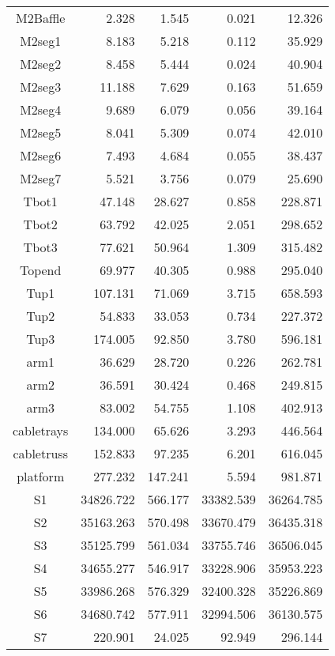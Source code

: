 \begin{longtable}{crrrr}
 M2Baffle & 2.328 & 1.545 & 0.021 & 12.326 \\
 M2seg1 & 8.183 & 5.218 & 0.112 & 35.929 \\
 M2seg2 & 8.458 & 5.444 & 0.024 & 40.904 \\
 M2seg3 & 11.188 & 7.629 & 0.163 & 51.659 \\
 M2seg4 & 9.689 & 6.079 & 0.056 & 39.164 \\
 M2seg5 & 8.041 & 5.309 & 0.074 & 42.010 \\
 M2seg6 & 7.493 & 4.684 & 0.055 & 38.437 \\
 M2seg7 & 5.521 & 3.756 & 0.079 & 25.690 \\
 Tbot1 & 47.148 & 28.627 & 0.858 & 228.871 \\
 Tbot2 & 63.792 & 42.025 & 2.051 & 298.652 \\
 Tbot3 & 77.621 & 50.964 & 1.309 & 315.482 \\
 Topend & 69.977 & 40.305 & 0.988 & 295.040 \\
 Tup1 & 107.131 & 71.069 & 3.715 & 658.593 \\
 Tup2 & 54.833 & 33.053 & 0.734 & 227.372 \\
 Tup3 & 174.005 & 92.850 & 3.780 & 596.181 \\
 arm1 & 36.629 & 28.720 & 0.226 & 262.781 \\
 arm2 & 36.591 & 30.424 & 0.468 & 249.815 \\
 arm3 & 83.002 & 54.755 & 1.108 & 402.913 \\
 cabletrays & 134.000 & 65.626 & 3.293 & 446.564 \\
 cabletruss & 152.833 & 97.235 & 6.201 & 616.045 \\
 platform & 277.232 & 147.241 & 5.594 & 981.871 \\
 S1 & 34826.722 & 566.177 & 33382.539 & 36264.785 \\
 S2 & 35163.263 & 570.498 & 33670.479 & 36435.318 \\
 S3 & 35125.799 & 561.034 & 33755.746 & 36506.045 \\
 S4 & 34655.277 & 546.917 & 33228.906 & 35953.223 \\
 S5 & 33986.268 & 576.329 & 32400.328 & 35226.869 \\
 S6 & 34680.742 & 577.911 & 32994.506 & 36130.575 \\
 S7 & 220.901 & 24.025 & 92.949 & 296.144 \\
\bottomrule
\end{longtable}




